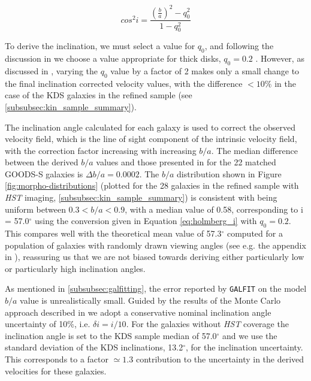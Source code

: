 \documentclass[fleqn,usenatbib]{mn2e}
\begin{document}
\begin{equation}\label{eq:holmberg_i}
   cos^{2}i = \frac{\left(\frac{b}{a}\right)^{2} - q_{0}^{2}}{1 - q_{0}^{2}}
\end{equation}


To derive the inclination, we must select a value for $q_{0}$, and following the discussion in \citep{Law2012a} we choose a value appropriate for thick disks, $q_{0} = 0.2$ \citep[e.g.][]{Epinat2012,Harrison2017}.
However, as discussed in \cite{Harrison2017}, varying the $q_{0}$ value by a factor of 2 makes only a small change to the final inclination corrected velocity values, with the difference $<10\%$ in the case of the KDS galaxies in the refined sample (see \cref{subsubsec:kin_sample_summary}).

The inclination angle calculated for each galaxy is used to correct the observed velocity field, which is the line of sight component of the intrinsic velocity field, with the correction factor increasing with increasing $b/a$.
The median difference between the derived $b/a$ values and those presented in \cite{VanderWel2012} for the 22 matched GOODS-S galaxies is $\Delta b/a = 0.0002$.
The $b/a$ distribution shown in Figure \ref{fig:morpho-distributions} (plotted for the 28 galaxies in the refined sample with {\em HST} imaging, \cref{subsubsec:kin_sample_summary}) is consistent with being uniform between $0.3 < b/a < 0.9$, with a median value of 0.58, corresponding to i = 57.0$^{\circ}$ using the conversion given in Equation \ref{eq:holmberg_i} with $q_{0}=0.2$.
This compares well with the theoretical mean value of 57.3$^{\circ}$ computed for a population of galaxies with randomly drawn viewing angles (see e.g. the appendix in \citealt{Law2009}), reassuring us that we are not biased towards deriving either particularly low or particularly high inclination angles.

As mentioned in \cref{subsubsec:galfitting}, the error reported by {\tt GALFIT} on the model $b/a$ value is unrealistically small.
Guided by the results of the Monte Carlo approach described in \cite{Epinat2012} we adopt a conservative nominal inclination angle uncertainty of 10$\%$, i.e. $\delta i = i / 10$.
For the galaxies without {\em HST} coverage the inclination angle is set to the KDS sample median of 57.0$^{\circ}$ and we use the standard deviation of the KDS inclinations, 13.2$^{\circ}$, for the inclination uncertainty.
This corresponds to a factor $\simeq1.3$ contribution to the uncertainty in the derived velocities for these galaxies.
\end{document}
